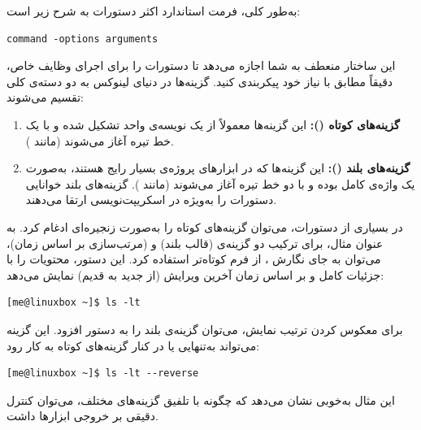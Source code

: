 به‌طور کلی، فرمت استاندارد اکثر دستورات به شرح زیر است:

\begin{latin}
\begin{lstlisting}
command -options arguments
\end{lstlisting}
\end{latin}

این ساختار منعطف به شما اجازه می‌دهد تا دستورات را برای اجرای وظایف خاص، دقیقاً مطابق با نیاز خود پیکربندی کنید. گزینه‌ها در دنیای لینوکس به دو دسته‌ی کلی تقسیم می‌شوند:

\begin{enumerate}
  \item \textbf{گزینه‌های کوتاه ():} این گزینه‌ها معمولاً از یک نویسه‌ی واحد تشکیل شده و با یک خط تیره آغاز می‌شوند (مانند ).

  \item \textbf{گزینه‌های بلند ():} این گزینه‌ها که در ابزارهای پروژه‌ی  بسیار رایج هستند، به‌صورت یک واژه‌ی کامل بوده و با دو خط تیره آغاز می‌شوند (مانند ). گزینه‌های بلند خوانایی دستورات را به‌ویژه در اسکریپت‌نویسی ارتقا می‌دهند.
\end{enumerate}

در بسیاری از دستورات، می‌توان گزینه‌های کوتاه را به‌صورت زنجیره‌ای ادغام کرد. به عنوان مثال، برای ترکیب دو گزینه‌ی  (قالب بلند) و  (مرتب‌سازی بر اساس زمان)، می‌توان به جای نگارش ، از فرم کوتاه‌تر  استفاده کرد. این دستور، محتویات را با جزئیات کامل و بر اساس زمان آخرین ویرایش (از جدید به قدیم) نمایش می‌دهد:

\begin{latin}
\begin{lstlisting}
[me@linuxbox ~]$ ls -lt
\end{lstlisting}
\end{latin}

برای معکوس کردن ترتیب نمایش، می‌توان گزینه‌ی بلند  را به دستور افزود. این گزینه می‌تواند به‌تنهایی یا در کنار گزینه‌های کوتاه به کار رود:

\begin{latin}
\begin{lstlisting}
[me@linuxbox ~]$ ls -lt --reverse
\end{lstlisting}
\end{latin}

این مثال به‌خوبی نشان می‌دهد که چگونه با تلفیق گزینه‌های مختلف، می‌توان کنترل دقیقی بر خروجی ابزارها داشت.

